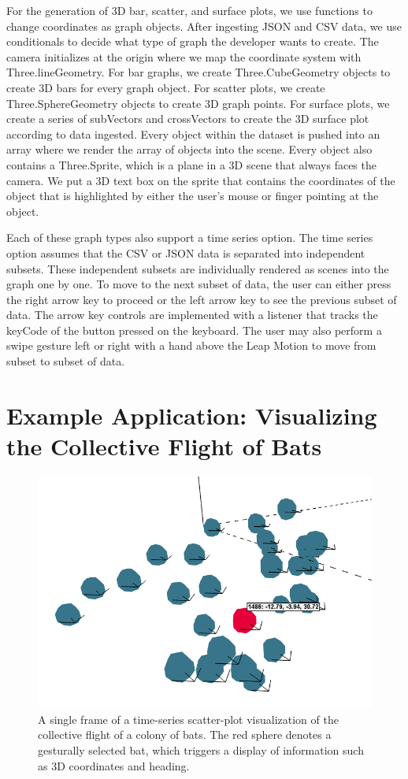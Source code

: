 \documentclass{vgtc}                          %
\begin{document}
For the generation of 3D bar, scatter, and surface plots, we use functions to change coordinates as graph objects. After ingesting JSON and CSV data, we use conditionals to decide what type of graph the developer wants to create. The camera initializes at the origin where we map the coordinate system with Three.lineGeometry. For bar graphs, we create Three.CubeGeometry objects to create 3D bars for every graph object. For scatter plots, we create Three.SphereGeometry objects to create 3D graph points. For surface plots, we create a series of subVectors and crossVectors to create the 3D surface plot according to data ingested. Every object within the dataset is pushed into an array where we render the array of objects into the scene. Every object also contains a Three.Sprite, which is a plane in a 3D scene that always faces the camera. We put a 3D text box on the sprite that contains the coordinates of the object that is highlighted by either the user’s mouse or finger pointing at the object. 

Each of these graph types also support a time series option. The time series option assumes that the CSV or JSON data is separated into independent subsets. These independent subsets are individually rendered as scenes into the graph one by one. To move to the next subset of data, the user can either press the right arrow key to proceed or the left arrow key to see the previous subset of data. The arrow key controls are implemented with a listener that tracks the keyCode of the button pressed on the keyboard. The user may also perform a swipe gesture left or right with a hand above the Leap Motion to move from subset to subset of data.

\section{Example Application: Visualizing the Collective Flight of Bats}

\begin{figure}[t]
\begin{center}
   \includegraphics[width=0.75\linewidth]{figure7}
\end{center}
   \caption{A single frame of a time-series scatter-plot visualization of the collective flight of a colony of bats. The red sphere denotes a gesturally selected bat, which triggers a display of information such as 3D coordinates and heading.}
\end{figure}
\end{document}
